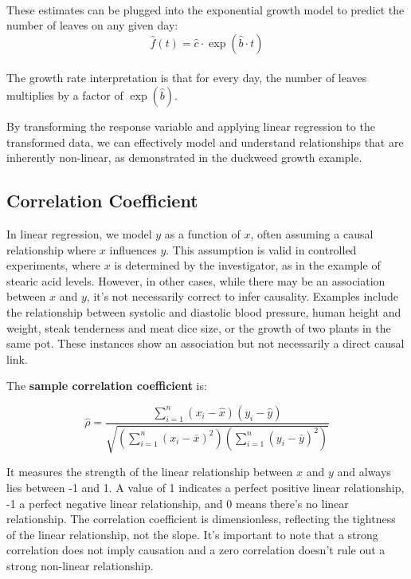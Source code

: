 \documentclass{article}
\begin{document}
\paragraph{}
These estimates can be plugged into the exponential growth model to predict the number of leaves on any given day:
\begin{equation}
\hat{f}(t) = \hat{c} \cdot \exp(\hat{b} \cdot t)
\end{equation}
\paragraph{}
The growth rate interpretation is that for every day, the number of leaves multiplies by a factor of $\exp(\hat{b})$. \hfill \break

By transforming the response variable and applying linear regression to the transformed data, we can effectively model and understand relationships that are inherently non-linear, as demonstrated in the duckweed growth example. \hfill \break
 \hfill \break
 \hfill \break

\subsection{Correlation Coefficient}

In linear regression, we model $y$ as a function of $x$, often assuming a causal relationship where $x$ influences $y$. This assumption is valid in controlled experiments, where $x$ is determined by the investigator, as in the example of stearic acid levels. However, in other cases, while there may be an association between $x$ and $y$, it's not necessarily correct to infer causality. Examples include the relationship between systolic and diastolic blood pressure, human height and weight, steak tenderness and meat dice size, or the growth of two plants in the same pot. These instances show an association but not necessarily a direct causal link. \hfill \break

The\textbf{ sample correlation coefficient} is: 

\begin{equation*}
\hat \rho = \frac{\sum_{i=1}^{n} {(x_i-\hat{x})(y_i-\hat{y})}}
{\sqrt{(\sum_{i=1}^{n} {(x_i-\bar{x})^2})(\sum_{i=1}^{n} {(y_i-\bar{y})^2})}}
\end{equation*}

It measures the strength of the linear relationship between $x$ and $y$ and always lies between -1 and 1. A value of 1 indicates a perfect positive linear relationship, -1 a perfect negative linear relationship, and 0 means there's no linear relationship. The correlation coefficient is dimensionless, reflecting the tightness of the linear relationship, not the slope. It's important to note that a strong correlation does not imply causation and a zero correlation doesn't rule out a strong non-linear relationship.
\end{document}
